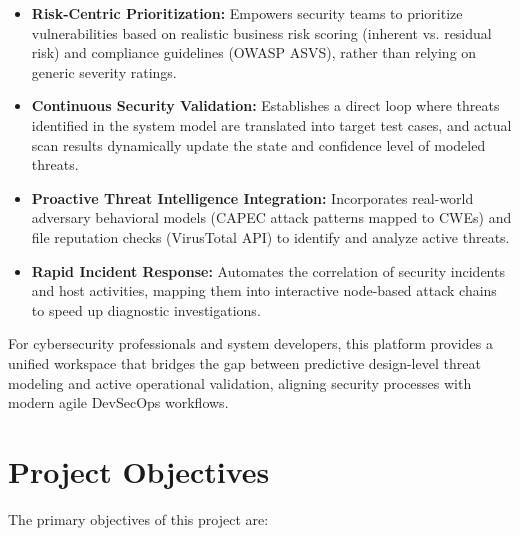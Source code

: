 \begin{itemize}
    \item \textbf{Risk-Centric Prioritization:} Empowers security teams to prioritize vulnerabilities based on realistic business risk scoring (inherent vs. residual risk) and compliance guidelines (OWASP ASVS), rather than relying on generic severity ratings.
    \item \textbf{Continuous Security Validation:} Establishes a direct loop where threats identified in the system model are translated into target test cases, and actual scan results dynamically update the state and confidence level of modeled threats.
    \item \textbf{Proactive Threat Intelligence Integration:} Incorporates real-world adversary behavioral models (CAPEC attack patterns mapped to CWEs) and file reputation checks (VirusTotal API) to identify and analyze active threats.
    \item \textbf{Rapid Incident Response:} Automates the correlation of security incidents and host activities, mapping them into interactive node-based attack chains to speed up diagnostic investigations.
\end{itemize}

For cybersecurity professionals and system developers, this platform provides a unified workspace that bridges the gap between predictive design-level threat modeling and active operational validation, aligning security processes with modern agile DevSecOps workflows.

\section{Project Objectives}

The primary objectives of this project are:


